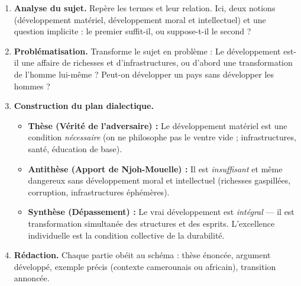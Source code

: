 \documentclass[11pt]{article}
\newcommand{\cle}[1]{{\popxbold\color{popdark}#1}}
\begin{document}
\begin{methode}
\begin{enumerate}
\item \textbf{Analyse du sujet.} Repère les termes et leur relation. Ici, deux notions (\cle{développement matériel}, \cle{développement moral et intellectuel}) et une question implicite : le premier suffit-il, ou suppose-t-il le second ?
\item \textbf{Problématisation.} Transforme le sujet en problème : Le développement est-il une affaire de richesses et d'infrastructures, ou d'abord une transformation de l'homme lui-même ? Peut-on développer un pays sans développer les hommes ?
\item \textbf{Construction du plan dialectique.}
\begin{itemize}
\item \textbf{Thèse (Vérité de l'adversaire) :} Le développement matériel est une condition \emph{nécessaire} (on ne philosophe pas le ventre vide ; infrastructures, santé, éducation de base).
\item \textbf{Antithèse (Apport de Njoh-Mouelle) :} Il est \emph{insuffisant} et même dangereux sans développement moral et intellectuel (richesses gaspillées, corruption, infrastructures éphémères).
\item \textbf{Synthèse (Dépassement) :} Le vrai développement est \emph{intégral} — il est transformation simultanée des structures et des esprits. L'excellence individuelle est la condition collective de la durabilité.
\end{itemize}
\item \textbf{Rédaction.} Chaque partie obéit au schéma : thèse énoncée, argument développé, exemple précis (contexte camerounais ou africain), transition annoncée.
\end{enumerate}
\end{methode}
\end{document}
